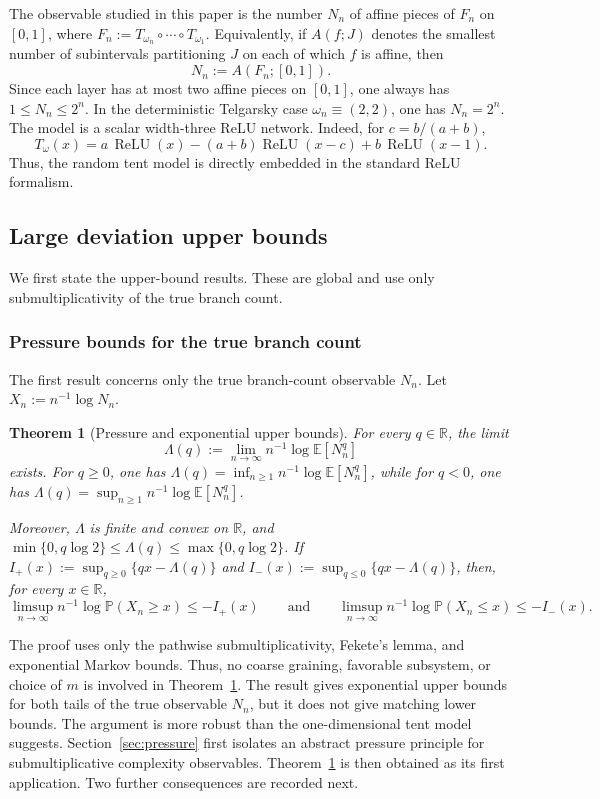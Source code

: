 \documentclass[11pt]{amsart}
\numberwithin{equation}{section}
\theoremstyle{plain}
\newtheorem{theorem}{Theorem}[section]
\theoremstyle{definition}
\theoremstyle{remark}
\begin{document}
The observable studied in this paper is the number \(N_n\) of affine pieces of \(F_n\) on \([0,1]\), where \(F_n:=T_{\omega_n}\circ\cdots\circ T_{\omega_1}\). Equivalently, if \(A(f;J)\) denotes the smallest number of subintervals partitioning \(J\) on each of which \(f\) is affine, then
\[
N_n:=A(F_n;[0,1]).
\]
Since each layer has at most two affine pieces on \([0,1]\), one always has \(1\le N_n\le2^n\). In the deterministic Telgarsky case \(\omega_n\equiv(2,2)\), one has \(N_n=2^n\).
The model is a scalar width-three ReLU network. Indeed, for \(c=b/(a+b)\),
\[
T_\omega(x)
=
a\,\operatorname{ReLU}(x)
-(a+b)\operatorname{ReLU}(x-c)
+b\,\operatorname{ReLU}(x-1).
\]
Thus, the random tent model is directly embedded in the standard ReLU formalism.

\subsection{Large deviation upper bounds}\label{subsec:ldp-upper}

We first state the upper-bound results. These are global and use only submultiplicativity of the true branch count. 

\subsubsection{Pressure bounds for the true branch count}

The first result concerns only the true branch-count observable \(N_n\). Let \(X_n:=n^{-1}\log N_n\).

\begin{theorem}[Pressure and exponential upper bounds]\label{thm:main-pressure}
For every \(q\in\mathbb R\), the limit \[\Lambda(q):=\lim_{n\to\infty} n^{-1}\log\mathbb E[N_n^q]\]
exists. For \(q\ge0\), one has \(\Lambda(q)=\inf_{n\ge1} n^{-1}\log\mathbb E[N_n^q]\), while for \(q<0\), one has \(\Lambda(q)=\sup_{n\ge1} n^{-1}\log\mathbb E[N_n^q]\). 

	Moreover, \(\Lambda\) is finite and convex on \(\mathbb R\), and \(\min\{0,q\log 2\}\le \Lambda(q)\le \max\{0,q\log 2\}\). If \(I_+(x):=\sup_{q\ge0}\{qx-\Lambda(q)\}\) and \(I_-(x):=\sup_{q\le0}\{qx-\Lambda(q)\}\), then, for every \(x\in\mathbb R\),
\[
\limsup_{n\to\infty} n^{-1}\log\mathbb P(X_n\ge x)\le -I_+(x)
\qquad\text{and}\qquad
\limsup_{n\to\infty} n^{-1}\log\mathbb P(X_n\le x)\le -I_-(x).
\]
\end{theorem}

The proof uses only the pathwise submultiplicativity, Fekete's lemma, and exponential Markov bounds. Thus, no coarse graining, favorable subsystem, or choice of \(m\) is involved in Theorem~\ref{thm:main-pressure}. The result gives exponential upper bounds for both tails of the true observable \(N_n\), but it does not give matching lower bounds.
The argument is more robust than the one-dimensional tent model suggests. Section~\ref{sec:pressure} first isolates an abstract pressure principle for submultiplicative complexity observables. Theorem~\ref{thm:main-pressure} is then obtained as its first application. Two further consequences are recorded next.
\end{document}
